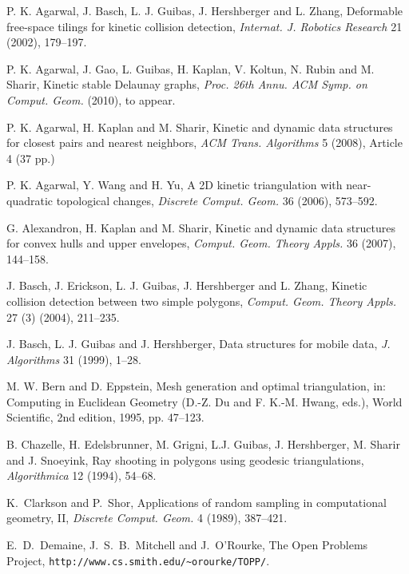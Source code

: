 \documentclass[11pt]{article}
\begin{document}
 

\begin{thebibliography}{}

 P. K. Agarwal, J. Basch, L. J. Guibas, J. Hershberger and L. Zhang,
Deformable free-space tilings for kinetic collision detection,
{\it Internat. J. Robotics Research} 21 (2002), 179--197.

P. K. Agarwal, J. Gao, L. Guibas, H. Kaplan, V. Koltun, N. Rubin and M. Sharir,
Kinetic stable Delaunay graphs, \textit{Proc. 26th Annu. ACM Symp. on Comput. Geom.} (2010), to appear.

P. K. Agarwal, H. Kaplan and M. Sharir,
Kinetic and dynamic data structures for closest pairs and nearest neighbors,
{\it ACM Trans. Algorithms} 5 (2008), Article 4 (37 pp.)

P. K. Agarwal, Y. Wang and H. Yu,
A 2D kinetic triangulation with near-quadratic topological changes,
\textit{Discrete Comput. Geom.} 36 (2006), 573--592.

G. Alexandron, H. Kaplan and M. Sharir,
Kinetic and dynamic data structures for convex hulls and upper
envelopes,
{\it Comput. Geom. Theory Appls.} 36 (2007), 144--158.

J. Basch, J. Erickson, L. J. Guibas, J. Hershberger and L. Zhang, Kinetic collision detection between two simple polygons, {\it Comput. Geom. Theory Appls.} 27 (3) (2004), 211--235.

J. Basch, L. J. Guibas and J. Hershberger,
Data structures for mobile data,
{\it J. Algorithms} 31 (1999), 1--28.

 M. W. Bern and D. Eppstein, Mesh generation and optimal triangulation, in: Computing in Euclidean
Geometry (D.-Z. Du and F. K.-M. Hwang, eds.), World
Scientific, 2nd edition, 1995, pp. 47--123.

 B. Chazelle, H. Edelsbrunner, M. Grigni, L.J. Guibas, J. Hershberger, M. Sharir and J. Snoeyink, Ray shooting in polygons using geodesic triangulations, {\it Algorithmica} 12 (1994), 54--68.





K.~Clarkson and P.~Shor, Applications of random sampling in
computational geometry, II, \emph{Discrete Comput. Geom.} 4 (1989),
387--421.


E.~D.~Demaine, J.~S.~B.~Mitchell and J.~O'Rourke,
The Open Problems Project,
\texttt{http://www.cs.smith.edu/\~{ }orourke/TOPP/}.



\end{thebibliography}
\end{document}
